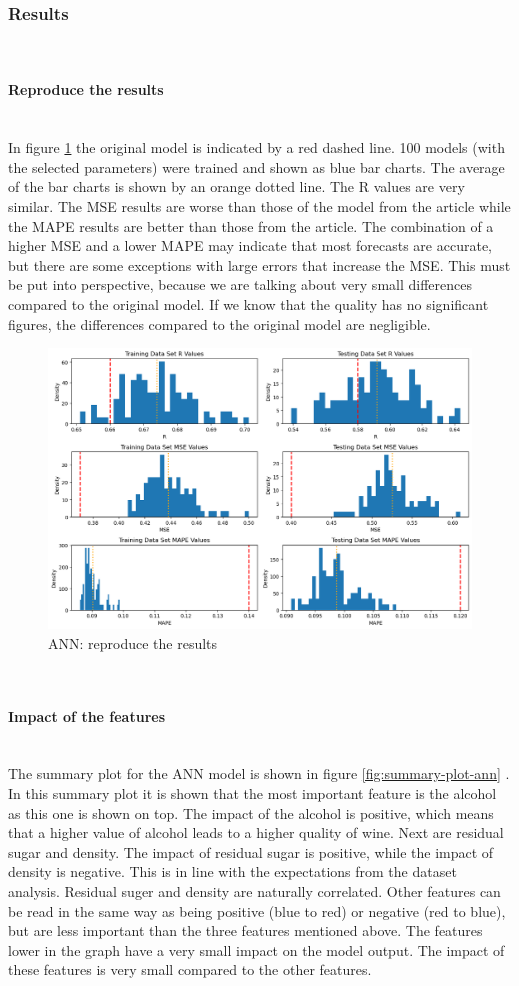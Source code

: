 \documentclass{article}
\newcommand{\subsubsubsection}[1]{%
  \paragraph{#1}\mbox{}\\}
\begin{document}
\subsubsection{Results}

\subsubsubsection{Reproduce the results}

In figure \ref{fig:ANN-reproduce-the-results} the original model is indicated by a red dashed line. 100 models (with the selected parameters) were trained and shown as blue bar charts. The average of the bar charts is shown by an orange dotted line.
The R values are very similar. The MSE results are worse than those of the model from the article while the MAPE results are better than those from the article.
The combination of a higher MSE and a lower MAPE may indicate that most forecasts are accurate, but there are some exceptions with large errors that increase the MSE.
This must be put into perspective, because we are talking about very small differences compared to the original model. If we know that the quality has no significant figures, the differences compared to the original model are negligible.

\begin{figure}
	\centering
	\includegraphics[width=\linewidth]{figures/ANN_reproduce_the_results.png}
	\caption{ANN: reproduce the results}
	\label{fig:ANN-reproduce-the-results}
\end{figure}


\subsubsubsection{Impact of the features}
The summary plot for the ANN model is shown in figure \autoref{fig:summary-plot-ann} .
In this summary plot it is shown that the most important feature is the alcohol as this one is shown on top.
The impact of the alcohol is positive, which means that a higher value of alcohol leads to a higher quality of wine.
Next are residual sugar and density. The impact of residual sugar is positive, while the impact of density is negative.
This is in line with the expectations from the dataset analysis. Residual suger and density are naturally correlated.
Other features can be read in the same way as being positive (blue to red) or negative (red to blue), but are less important than the three features mentioned above.
The features lower in the graph have a very small impact on the model output.
The impact of these features is very small compared to the other features.
\end{document}
